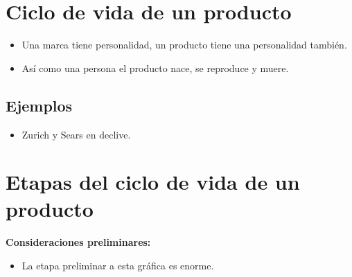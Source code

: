 \section{Ciclo de vida de un producto}
\begin{itemize}
    \item Una marca tiene personalidad, un producto tiene una personalidad también.
    \item Así como una persona el producto nace, se reproduce y muere.
\end{itemize}

\subsection{Ejemplos}
\begin{itemize}
    \item Zurich y Sears en declive.
\end{itemize}


\section{Etapas del ciclo de vida de un producto}
\textbf{Consideraciones preliminares:}
\begin{itemize}
    \item La etapa preliminar a esta gráfica es enorme.
\end{itemize}

